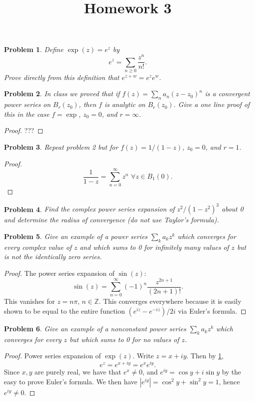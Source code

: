 \documentclass[11pt, letterpaper]{article}
\title{Homework 3}
\theoremstyle{plain}
\newtheorem{problem}{Problem}
\begin{document}
\makeproblem

\begin{problem}\label{1}
	Define $\exp (z)=e^z$ by
	\[
		e^z=\sum_{n\geq 0} \frac{z^n}{n!} 
	.\]
	Prove directly from this definition that $e^{z+w} =e^ze^w$.
\end{problem}
\begin{problem}
	In class we proved that if $f(z)=\sum_{n} a_n(z-z_0)^n$ is a convergent power series on $B_r(z_0)$, then $f$ is analytic on $B_r(z_0)$. Give a one line proof of this in the case $f=\exp $, $z_0=0$, and $r=\infty $.
\end{problem}
\begin{proof}
	???
\end{proof}

\begin{problem}
	Repeat problem 2 but for $f(z)=1/(1-z)$, $z_0=0$, and $r=1$.
\end{problem}
\begin{proof}
	\[
		\frac{1}{1-z} =\sum_{n=0}^{\infty} z^n\,\,\forall z\in B_1(0)
	.\]
\end{proof}

\begin{problem}
	Find the complex power series expansion of $z^2/(1-z^2)^3$ about 0 and determine the radius of convergence (do not use Taylor's formula).
\end{problem}
\begin{problem}
	Give an example of a power series $\sum_{k} a_kz^k$ which converges for every complex value of $z$ and which sums to 0 for infinitely many values of $z$ but is not the identically zero series.
\end{problem}
\begin{proof}
	The power series expansion of $\sin (z)$:
	\[
		\sin (z)=\sum_{n=0}^{\infty} (-1)^n \frac{z^{2n+1} }{(2n+1)!} 
	.\]
	This vanishes for $z=n\pi $, $n\in\mathbb{Z} $. This converges everywhere because it is easily shown to be equal to the entire function $(e^{iz}-e^{-iz} )/2i$ via Euler's formula.
\end{proof}

\begin{problem}
	Give an example of a nonconstant power series $\sum_{k} a_kz^k$ which converges for every $z$ but which sums to 0 for no values of $z$.
\end{problem}
\begin{proof}
	Power series expansion of $\exp (z)$. Write $z=x+iy$. Then by \cref{1},
	\[
		e^z=e^{x+iy} =e^xe^{iy} 
	.\]
	Since $x,y$ are purely real, we have that $e^x\neq 0$, and $e^{iy} =\cos y + i \sin y$ by the easy to prove Euler's formula. We then have $\left| e^{iy}  \right| =\cos^2y+\sin ^2y = 1$, hence $e^{iy} \neq 0$. 
\end{proof}
\end{document}
